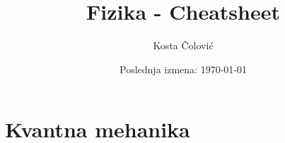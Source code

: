 \documentclass[a4paper,12pt]{report}
\title{Fizika - Cheatsheet}
\author{Kosta Čolović}
\date{Poslednja izmena: \today}
\numberwithin{algorithm}{section}
\begin{document}
\maketitle
\setcounter{page}{2}
\tableofcontents
\newpage

\chapter{Kvantna mehanika}
\end{document}
